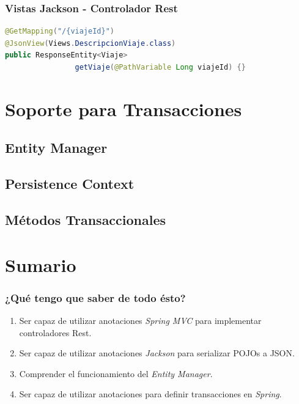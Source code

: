 \documentclass[handout,a4paper,slidestop,xcolor=pst,blue]{beamer}
\begin{document}
\begin{frame}[c,fragile]
    \frametitle{Vistas Jackson - Controlador Rest}
\begin{lstlisting}[basicstyle=\small,language=Java]
@GetMapping("/{viajeId}")
@JsonView(Views.DescripcionViaje.class)
public ResponseEntity<Viaje> 
                getViaje(@PathVariable Long viajeId) {}
\end{lstlisting}
\end{frame}

\section{Soporte para Transacciones}

\subsection{Entity Manager}


\subsection{Persistence Context}


\subsection{Métodos Transaccionales}


\section{Sumario}

\begin{frame}[c]
    \frametitle{¿Qué tengo que saber de todo ésto?}
    \begin{enumerate}[<+->]
        \item Ser capaz de utilizar anotaciones \emph{Spring MVC} para implementar controladores Rest.
        \item Ser capaz de utilizar anotaciones \emph{Jackson} para serializar POJOs a JSON.
        \item Comprender el funcionamiento del \emph{Entity Manager}.
        \item Ser capaz de utilizar anotaciones para definir transacciones en \emph{Spring}.
    \end{enumerate}
\end{frame}
\end{document}
